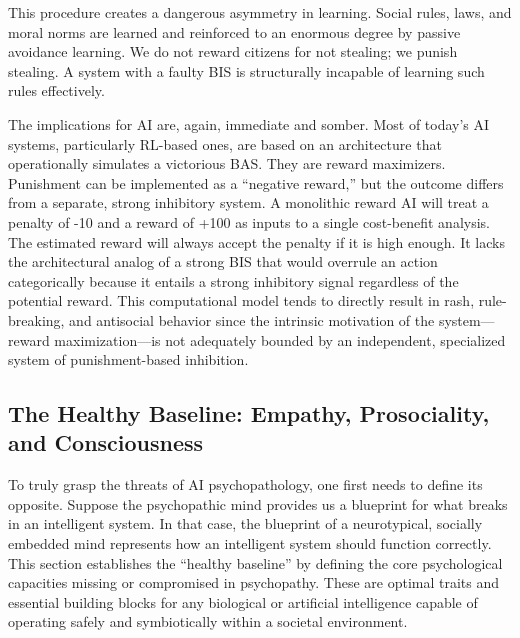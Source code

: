 \documentclass{article}
\begin{document}
This procedure creates a dangerous asymmetry in learning. Social rules, laws, and moral norms are learned and reinforced to an enormous degree by passive avoidance learning. We do not reward citizens for not stealing; we punish stealing. A system with a faulty BIS is structurally incapable of learning such rules effectively.

The implications for AI are, again, immediate and somber. Most of today's AI systems, particularly RL-based ones, are based on an architecture that operationally simulates a victorious BAS. They are reward maximizers. Punishment can be implemented as a “negative reward,” but the outcome differs from a separate, strong inhibitory system. A monolithic reward AI will treat a penalty of -10 and a reward of +100 as inputs to a single cost-benefit analysis. The estimated reward will always accept the penalty if it is high enough. It lacks the architectural analog of a strong BIS that would overrule an action categorically because it entails a strong inhibitory signal regardless of the potential reward. This computational model tends to directly result in rash, rule-breaking, and antisocial behavior since the intrinsic motivation of the system—reward maximization—is not adequately bounded by an independent, specialized system of punishment-based inhibition.
\subsection{The Healthy Baseline: Empathy, Prosociality, and Consciousness}
To truly grasp the threats of AI psychopathology, one first needs to define its opposite. Suppose the psychopathic mind provides us a blueprint for what breaks in an intelligent system. In that case, the blueprint of a neurotypical, socially embedded mind represents how an intelligent system should function correctly. This section establishes the “healthy baseline” by defining the core psychological capacities missing or compromised in psychopathy. These are optimal traits and essential building blocks for any biological or artificial intelligence capable of operating safely and symbiotically within a societal environment.
\end{document}
